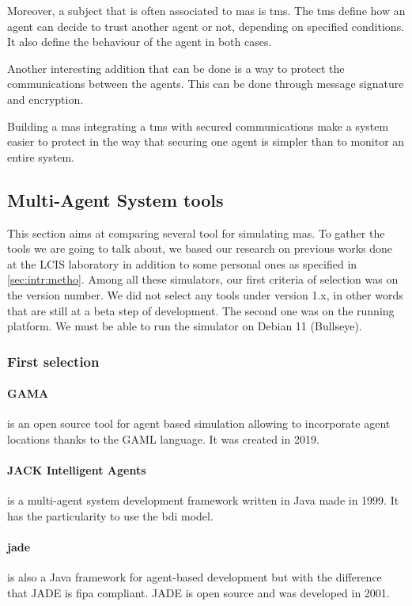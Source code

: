 \documentclass[12pt]{report}
\begin{document}
Moreover, a subject that is often associated to \gls{mas} is \gls{tms}. 
The \gls{tms} define how an agent can decide to trust another agent or not, depending on specified conditions. It also define the behaviour of the agent in both cases. 

Another interesting addition that can be done is a way to protect the communications between the agents.
This can be done through message signature and encryption.

Building a \gls{mas} integrating a \gls{tms} with secured communications make a system easier to protect in the way that securing one agent is simpler than to monitor an entire system.


\subsection{Multi-Agent System tools}
\label{sec:bg:mas:tool}
This section aims at comparing several tool for simulating \gls{mas}. To gather the tools we are going to talk about, we based our research on previous works done at the LCIS laboratory \cite{bonnet_adrian_securisation_nodate}\cite{derdour_najoua_conception_nodate} in addition to some personal ones as specified in \ref{sec:intr:metho}. Among all these simulators, our first criteria of selection was on the version number. We did not select any tools under version 1.x, in other words that are still at a beta step of development. The second one was on the running platform. We must be able to run the simulator on Debian 11 (Bullseye).

\subsubsection{First selection}
\paragraph{GAMA~\cite{taillandier_building_2019}} is an open source tool for agent based simulation allowing to incorporate agent locations thanks to the GAML language. It was created in 2019.
\paragraph{JACK Intelligent Agents~\cite{busetta_jack_1999}} is a multi-agent system development framework written in Java made in 1999. It has the particularity to use the \gls{bdi} model.
\paragraph{\gls{jade}~\cite{bellifemine_agent_2001}} is also a Java framework for agent-based development but with the difference that JADE is \gls{fipa} compliant. JADE is open source and was developed in 2001.
\end{document}
